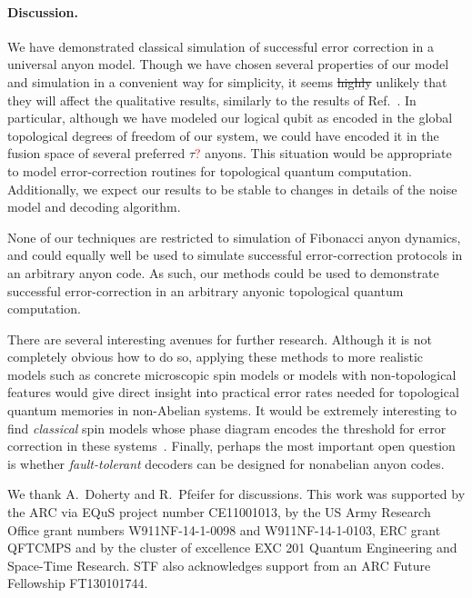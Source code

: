 \documentclass[aps, prl, letterpaper, twocolumn, superscriptaddress, notitlepage, 10pt]{revtex4-1}
\newcommand{\dude}[1]{\textcolor{red}{#1}}
\begin{document}
\paragraph{Discussion.}

We have demonstrated classical simulation of successful error correction in a universal anyon model. 
Though we have chosen several properties of our model and 
simulation in a convenient way for simplicity, it seems \sout{highly}
unlikely that they will affect the qualitative results, similarly to the results of Ref.~\cite{Brell2013}. 
In particular, although we have modeled our logical qubit as 
encoded in the global topological degrees of freedom of our 
system, we could have encoded it in the fusion space of several preferred $\tau$\dude{?} anyons. 
This situation would be appropriate to model error-correction routines for topological quantum computation. 
Additionally, we expect our results to be stable to changes in details of the noise model and decoding algorithm.

None of our techniques are restricted to simulation of Fibonacci anyon dynamics, and could 
equally well be used to simulate successful error-correction protocols in an arbitrary anyon code. 
As such, our methods could be used to demonstrate successful 
error-correction in an arbitrary anyonic topological quantum computation.

There are several interesting avenues for further research. 
Although it is not completely obvious how to do so, 
applying these methods to more realistic models such as concrete 
microscopic spin models or models with non-topological features would give 
direct insight into practical error rates needed for topological quantum memories in non-Abelian systems. 
It would be extremely interesting to find \emph{classical} spin models 
whose phase diagram encodes the threshold for error correction in these systems~\cite{Dennis2002}.
Finally, perhaps the most important open question is whether 
\emph{fault-tolerant} decoders can be designed for nonabelian anyon codes. 


\acknowledgments 

We thank A.\ Doherty and R.\ Pfeifer for discussions. 
This work was supported by the ARC via EQuS project number CE11001013, by the US Army Research Office grant numbers W911NF-14-1-0098 and W911NF-14-1-0103, ERC grant QFTCMPS and by the cluster of excellence EXC 201 Quantum Engineering and Space-Time Research. STF also acknowledges support from an ARC Future Fellowship FT130101744.


\end{document}
